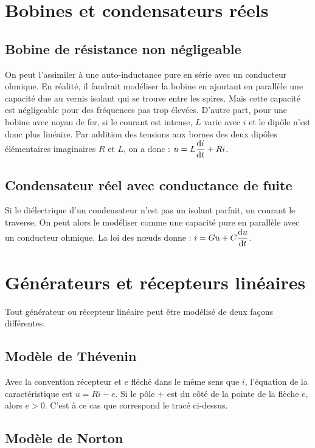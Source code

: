 \section{Bobines et condensateurs réels}%

\subsection{Bobine de résistance non négligeable}%

On peut l'assimiler à une auto-inductance pure en série avec un conducteur 
ohmique. En réalité, il faudrait modéliser la bobine en ajoutant en parallèle 
une capacité due au vernis isolant qui se trouve entre les spires. Mais cette 
capacité est négligeable pour des fréquences pas trop élevées. D'autre part, 
pour une bobine avec noyau de fer, si le courant est intense, \(L\) varie avec 
\(i\) et le dipôle n'est donc plus linéaire. Par addition des tensions aux 
bornes des deux dipôles élémentaires imaginaires \(R\) et \(L\), on a donc : 
\(u = L\dfrac{\mathrm{d} i}{\mathrm{d} t} + Ri\).

\subsection{Condensateur réel avec conductance de fuite}%

Si le diélectrique d'un condensateur n'est pas un isolant parfait, un courant 
le traverse. On peut alors le modéliser comme une capacité pure en parallèle 
avec un conducteur ohmique.
La loi des nœuds donne : \(i = Gu + C \dfrac{\mathrm{d} u}{\mathrm{d} t}\).

\section{Générateurs et récepteurs linéaires}%

Tout générateur ou récepteur linéaire peut être modélisé de deux façons 
différentes.

\subsection{Modèle de Thévenin}%

Avec la convention récepteur et \(e\) fléché dans le même sens que \(i\), 
l'équation de la caractéristique est \(u=Ri-e\). Si le pôle + est du côté de la 
pointe de la flèche \(e\), alors \(e > 0\). C'est à ce cas que correspond le 
tracé ci-dessus.

\subsection{Modèle de Norton}%

